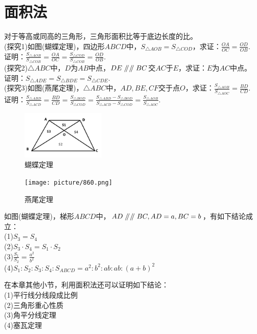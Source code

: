 \documentclass{ecnuthesis}
\newcommand\px{\mathrel{/\mkern-5mu/}}  %
\begin{document}
\section{面积法}
\begin{knowledge}
    对于等高或同高的三角形，三角形面积比等于底边长度的比。\\
    (探究1)如图(蝴蝶定理)，四边形$ABCD$中，$S_{\triangle AOB}=S_{\triangle COD}$，求证：$\frac{OA}{OC}=\frac{OD}{OB}.$ \\
    证明：$\frac{S_{\triangle AOB}}{S_{\triangle COB}}=\frac{OA}{OC}=\frac{S_{\triangle COD}}{S_{\triangle COB}}=\frac{OD}{OB}$. \\
    (探究2)$\triangle ABC$中，$D$为$AB$中点，$DE\px \px BC$交$AC$于$E$，求证：$E$为$AC$中点。\\
    证明：$S_{\triangle ADE}=S_{\triangle BDE}=S_{\triangle CDE}.$ \\
    (探究3)如图(燕尾定理)，$\triangle ABC$中，$AD,BE,CF$交于点$O$，求证：$\frac{S_{\triangle AOB}}{S_{\triangle AOC}}=\frac{BD}{CD}$. \\
    证明：$\frac{S_{\triangle ABD}}{S_{\triangle ACD}}=\frac{BD}{CD}=\frac{S_{\triangle BOD}}{S_{\triangle COD}}=\frac{S_{\triangle ABD}-S_{\triangle BOD}}{S_{\triangle ACD}-S_{\triangle COD}}=\frac{S_{\triangle AOB}}{S_{\triangle AOC}}.$
\end{knowledge}
\begin{figure}[H]
\centering
\includegraphics[width=4cm]{picture/690.png}
\caption{蝴蝶定理}
\end{figure}
\begin{figure}[H]
\centering
\texttt{[image: picture/860.png]}
\caption{燕尾定理}
\end{figure}
\begin{model}
    如图(蝴蝶定理)，梯形$ABCD$中，$AD\px\px BC,AD=a,BC=b$，有如下结论成立：\\
    (1)$S_3=S_4$ \\
    (2)$S_3·S_4=S_1·S_2$ \\
    (3)$\frac{S_1}{S_2}=\frac{a^2}{b^2}$ \\
    (4)$S_1:S_2:S_3:S_4:S_{ABCD}=a^2:b^2:ab:ab:(a+b)^2$
\end{model}
\begin{knowledge}
    在本章其他小节，利用面积法还可以证明如下结论：\\
    (1)平行线分线段成比例 \\
    (2)三角形重心性质 \\
    (3)角平分线定理 \\
    (4)塞瓦定理
\end{knowledge}
\clearpage
\end{document}
